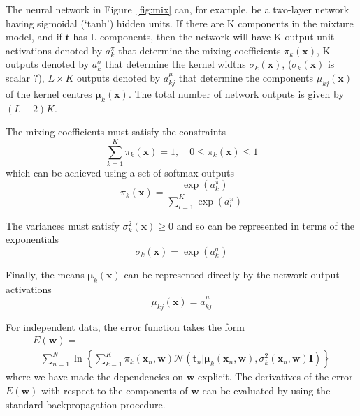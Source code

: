 \documentclass[5p,sort&compress]{elsarticle}
\begin{document}
The neural network in Figure~\ref{fig:mix} can, for example, be a two-layer network having sigmoidal (`tanh') hidden units. If there are K components in the mixture model, and if $\mathbf{t}$ has L components, then the network will have K output unit activations denoted by $a_k^{\pi}$ that determine the mixing coefficients $\pi_k(\mathbf{x})$, K outputs denoted by $a_k^{\sigma}$ that determine the kernel widths $\sigma_k(\mathbf{x})$, ($\sigma_k(\mathbf{x})$ is scalar ?), $L \times K$ outputs denoted by $a_{kj}^{\mu}$ that determine the components $\mu_{kj}(\mathbf{x})$ of the kernel centres $\boldsymbol{\mu}_k(\mathbf{x})$. The total number of network outputs is given by $(L+2)K$.

The mixing coefficients must satisfy the constraints
\begin{equation}
\sum_{k=1}^{K} \pi_{k}(\mathbf{x})=1, \quad 0 \leqslant \pi_{k}(\mathbf{x}) \leqslant 1
\end{equation}
which can be achieved using a set of softmax outputs
\begin{equation}
\pi_{k}(\mathbf{x})=\frac{\exp \left(a_{k}^{\pi}\right)}{\sum_{l=1}^{K} \exp \left(a_{l}^{\pi}\right)}
\end{equation}

The variances must satisfy $\sigma_k^2(\mathbf{x}) \geq 0$ and so can be represented in terms of the exponentials
\begin{equation}
\sigma_{k}(\mathbf{x})=\exp \left(a_{k}^{\sigma}\right)
\end{equation}

Finally, the means $\boldsymbol{\mu}_k(\mathbf{x})$ can be represented directly by the network output activations
\begin{equation}
\mu_{k j}(\mathbf{x})=a_{k j}^{\mu}
\end{equation}

For independent data, the error function takes the form
\begin{equation}
\begin{aligned}
E(\mathbf{w})= \\
-\sum_{n=1}^{N} \ln \left\{\sum_{k=1}^{K} \pi_{k}\left(\mathbf{x}_{n}, \mathbf{w}\right) \mathcal{N}\left(\mathbf{t}_{n} | \boldsymbol{\mu}_{k}\left(\mathbf{x}_{n}, \mathbf{w}\right), \sigma_{k}^{2}\left(\mathbf{x}_{n}, \mathbf{w}\right)\mathbf{I}\right)\right\}
\end{aligned}
\end{equation}
where we have made the dependencies on $\mathbf{w}$ explicit. The derivatives of the error $E(\mathbf{w})$ with respect to the components of $\mathbf{w}$ can be evaluated by using the standard backpropagation procedure.
\end{document}
